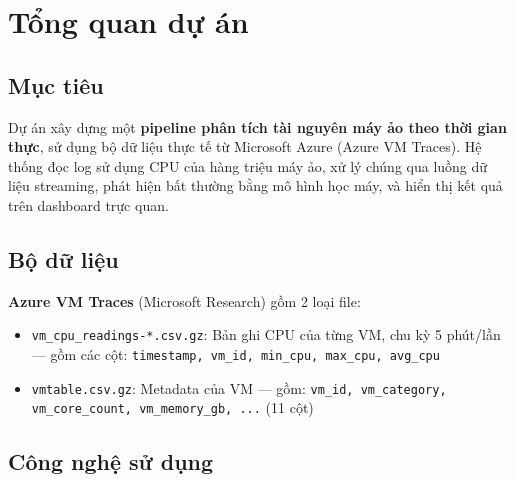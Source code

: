 \documentclass[12pt,a4paper]{article}
\begin{document}
\tableofcontents
\newpage

\section{Tổng quan dự án}

\subsection{Mục tiêu}

Dự án xây dựng một \textbf{pipeline phân tích tài nguyên máy ảo theo thời gian thực}, sử dụng bộ dữ liệu thực tế từ Microsoft Azure (Azure VM Traces). Hệ thống đọc log sử dụng CPU của hàng triệu máy ảo, xử lý chúng qua luồng dữ liệu streaming, phát hiện bất thường bằng mô hình học máy, và hiển thị kết quả trên dashboard trực quan.

\subsection{Bộ dữ liệu}

\begin{infobox}
\textbf{Azure VM Traces} (Microsoft Research) gồm 2 loại file:
\begin{itemize}[nosep]
  \item \texttt{vm\_cpu\_readings-*.csv.gz}: Bản ghi CPU của từng VM, chu kỳ 5 phút/lần — gồm các cột: \texttt{timestamp, vm\_id, min\_cpu, max\_cpu, avg\_cpu}
  \item \texttt{vmtable.csv.gz}: Metadata của VM — gồm: \texttt{vm\_id, vm\_category, vm\_core\_count, vm\_memory\_gb, ...} (11 cột)
\end{itemize}
\end{infobox}

\subsection{Công nghệ sử dụng}
\end{document}
